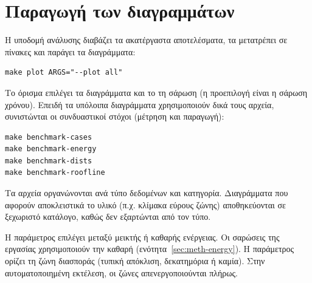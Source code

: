 \section{Παραγωγή των διαγραμμάτων}
\label{sec:repro-plots}

Η υποδομή ανάλυσης διαβάζει τα ακατέργαστα αποτελέσματα, τα μετατρέπει σε
πίνακες  και παράγει τα διαγράμματα:

\begin{verbatim}
make plot ARGS="--plot all"
\end{verbatim}

Το όρισμα  επιλέγει τα διαγράμματα και το  τη
σάρωση (η προεπιλογή είναι η σάρωση χρόνου). Επειδή τα υπόλοιπα διαγράμματα
χρησιμοποιούν δικά τους αρχεία, συνιστώνται οι συνδυαστικοί στόχοι (μέτρηση και
παραγωγή):

\begin{verbatim}
make benchmark-cases
make benchmark-energy
make benchmark-dists
make benchmark-roofline
\end{verbatim}

Τα αρχεία οργανώνονται ανά τύπο δεδομένων και κατηγορία. Διαγράμματα που
αφορούν αποκλειστικά το υλικό (π.χ. κλίμακα εύρους ζώνης) αποθηκεύονται σε
ξεχωριστό κατάλογο, καθώς δεν εξαρτώνται από τον τύπο.

Η παράμετρος  επιλέγει μεταξύ μεικτής ή καθαρής
ενέργειας. Οι σαρώσεις της εργασίας χρησιμοποιούν την καθαρή
(ενότητα~\ref{sec:meth-energy}). Η παράμετρος  ορίζει τη
ζώνη διασποράς (τυπική απόκλιση, δεκατημόρια ή καμία). Στην αυτοματοποιημένη
εκτέλεση, οι ζώνες απενεργοποιούνται πλήρως.
